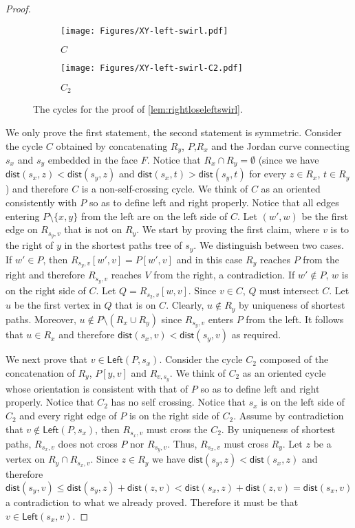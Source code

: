 \documentclass{article}
\newcommand{\Left}{\mathsf{Left}}
\newcommand{\dist}{\mathsf{dist}}
\begin{document}
\begin{proof}

\begin{figure}[ht]
    \centering
    \begin{subfigure}[t]{0.3\textwidth}
        \centering
        \texttt{[image: Figures/XY-left-swirl.pdf]}
        \caption{$C$}
    \end{subfigure}
    \hspace{1in}
    \begin{subfigure}[t]{0.3\textwidth}
        \centering
        \texttt{[image: Figures/XY-left-swirl-C2.pdf]}
        \caption{$C_2$}
    \end{subfigure}
    \caption{The cycles for the proof of \cref{lem:rightloseleftswirl}.}
    \label{fig:XY-left-swirl}
\end{figure}
    We only prove the first statement, the second statement is symmetric.
    Consider the cycle $C$ obtained by concatenating $R_y$, $P$,$R_x$ and the Jordan curve connecting $s_x$ and $s_y$ embedded in the face $F$.
    Notice that $R_x\cap R_y=\emptyset$ (since we have $\dist(s_x,z)<\dist(s_y,z)$ and $\dist(s_x,t)>\dist(s_y,t)$ for every $z\in R_x$, $t\in R_y$) and therefore $C$ is a non-self-crossing cycle.
    We think of $C$ as an oriented consistently with $P$ so as to define left and right properly.
    Notice that all edges entering $P\setminus\{x,y\}$ from the left are on the left side of $C$.
    Let $(w',w)$ be the first edge on $R_{s_y,v}$ that is not on $R_y$.
    We start by proving the first claim, where $v$ is to the right of $y$ in the shortest paths tree of $s_y$.
    We distinguish between two cases.
    If $w'\in P$, then $R_{s_y,v}[w',v]=P[w',v]$ and in this case $R_y$ reaches $P$ from the right and therefore $R_{s_y,v}$ reaches $V$ from the right, a contradiction.
    If $w'\notin P$, $w$ is on the right side of $C$.
    Let $Q=R_{s_2,v}[w,v]$.
    Since $v\in C$, $Q$ must intersect $C$.
    Let $u$ be the first vertex in $Q$ that is on $C$.
    Clearly, $u\notin R_y$ by uniqueness of shortest paths.
    Moreover, $u\notin P\setminus(R_x\cup R_y)$ since $R_{s_y,v}$ enters $P$ from the left.
    It follows that $u\in R_x$ and therefore $\dist(s_x,v)<\dist(s_y,v)$ as required.

    We next prove that $v\in \Left(P,s_x)$.
    Consider the cycle $C_2$ composed of the concatenation of $R_y$, $P[y,v]$ and $R_{v,s_y}$.
    We think of $C_2$ as an oriented cycle whose orientation is consistent with that of $P$ so as to define left and right properly.
    Notice that $C_2$ has no self crossing.
    Notice that $s_x$ is on the left side of $C_2$  and every right edge of $P$ is on the right side of $C_2$.
    Assume by contradiction that $v\notin\Left(P,s_x)$, then $R_{s_x,v}$ must cross the $C_2$.
    By uniqueness of shortest paths, $R_{s_x,v}$ does not cross $P$ nor $R_{s_y,v}$.
    Thus, $R_{s_x,v}$ must cross $R_y$.
    Let $z$ be a vertex on $R_y\cap R_{s_x,v}$.
    Since $z\in R_y$ we have $\dist(s_y,z)<\dist(s_x,z)$ and therefore $\dist(s_y,v)\le\dist(s_y,z)+\dist(z,v)<\dist(s_x,z)+\dist(z,v)=\dist(s_x,v)$ a contradiction to what we already proved.
    Therefore it must be that $v\in \Left(s_x,v)$.


\end{proof}
\end{document}
